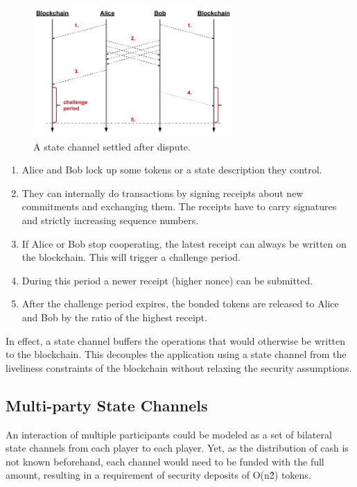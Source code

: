 \begin{figure}[!ht]
\centering
\includegraphics[width=3.0in]{images/dispute.png}
\caption{A state channel settled after dispute.}
\label{pc_dispute}
\end{figure}

\begin{enumerate}
\item Alice and Bob lock up some tokens or a state description they control.
\item They can internally do transactions by signing receipts about new commitments and exchanging them. The receipts have to carry signatures and strictly increasing sequence numbers.
\item If Alice or Bob stop cooperating, the latest receipt can always be written on the blockchain. This will trigger a challenge period.
\item During this period a newer receipt (higher nonce) can be submitted.
\item After the challenge period expires, the bonded tokens are released to Alice and Bob by the ratio of the highest receipt.
\end{enumerate}

In effect, a state channel buffers the operations that would otherwise be written to the blockchain. This decouples the application using a state channel from the liveliness constraints of the blockchain without relaxing the security assumptions.

\subsection{Multi-party State Channels}

An interaction of multiple participants could be modeled as a set of bilateral state channels from each player to each player. Yet, as the distribution of cash is not known beforehand, each channel would need to be funded with the full amount, resulting in a requirement of security deposits of O(n\^2) tokens.

